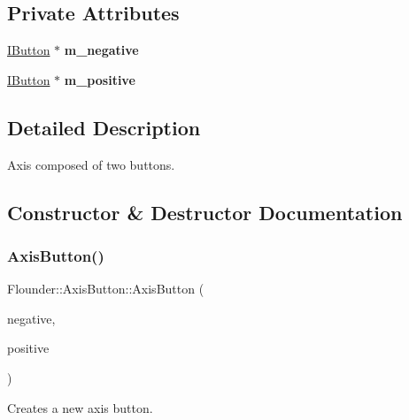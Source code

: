 \subsection*{Private Attributes}
\begin{DoxyCompactItemize}
\item 
\mbox{\label{class_flounder_1_1_axis_button_a837b5d73fbf9f23515f97141abb797f9}} 
\hyperlink{class_flounder_1_1_i_button}{I\+Button} $\ast$ {\bfseries m\+\_\+negative}
\item 
\mbox{\label{class_flounder_1_1_axis_button_ae7ae8d85967818f120d4069be9c17d85}} 
\hyperlink{class_flounder_1_1_i_button}{I\+Button} $\ast$ {\bfseries m\+\_\+positive}
\end{DoxyCompactItemize}


\subsection{Detailed Description}
Axis composed of two buttons. 



\subsection{Constructor \& Destructor Documentation}
\mbox{\label{class_flounder_1_1_axis_button_ab70b23665539aa2701a2e732f2ea2d86}} 
\subsubsection{\texorpdfstring{Axis\+Button()}{AxisButton()}}
{\footnotesize\ttfamily Flounder\+::\+Axis\+Button\+::\+Axis\+Button (\begin{DoxyParamCaption}\item[{\hyperlink{class_flounder_1_1_i_button}{I\+Button} $\ast$}]{negative,  }\item[{\hyperlink{class_flounder_1_1_i_button}{I\+Button} $\ast$}]{positive }\end{DoxyParamCaption})}



Creates a new axis button. 


